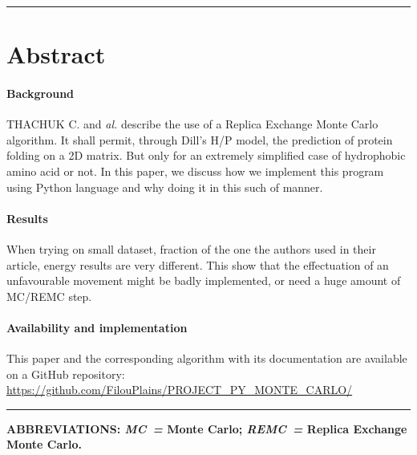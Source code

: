 \documentclass[12pt, oneside, a4paper]{report}
\begin{document}
\begin{center}
    \begin{minipage}{16cm}
        \hrule height 0.5pt width 16cm
        \vspace{1ex}
        \section*{Abstract}

        \paragraph*{Background}
        THACHUK C. and \textit{al.} describe the use of a Replica Exchange Monte Carlo algorithm. It shall permit, through Dill's H/P model, the prediction of protein folding on a 2D matrix. But only for an extremely simplified case of hydrophobic amino acid or not. In this paper, we discuss how we implement this program using Python language and why doing it in this such of manner.

        \vspace{1ex}

        \paragraph*{Results}
        When trying on small dataset, fraction of the one the authors used in their article, energy results are very different. This show that the effectuation of an unfavourable movement might be badly implemented, or need a huge amount of MC/REMC step.

        \vspace{1ex}

        \paragraph*{Availability and implementation}
        This paper and the corresponding algorithm with its documentation are available on a GitHub repository: \url{https://github.com/FilouPlains/PROJECT_PY_MONTE_CARLO/}

        \vspace{1ex}
        \hrule height 0.5pt width 16cm
        
        \vspace{1ex}
        
        \begin{footnotesize}
            \bfseries ABBREVIATIONS: \textit{MC~=} Monte Carlo; \textit{REMC~=} Replica Exchange Monte Carlo.
        \end{footnotesize}
    \end{minipage}
\end{center}
\end{document}
